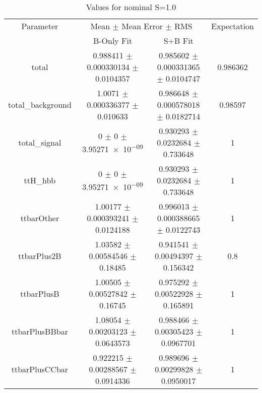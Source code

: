 \begin{table}
\centering
\caption{Values for nominal S=1.0}
\begin{tabular}{cccc}
\toprule
Parameter & \multicolumn{2}{c}{Mean $\pm$ Mean Error $\pm$ RMS} & Expectation\\
 & B-Only Fit & S+B Fit & \\
\midrule
total & \num{0.988411} $\pm$ \num{0.000330134} $\pm$ \num{0.0104357} & \num{0.985602} $\pm$ \num{0.000331365} $\pm$ \num{0.0104747} & \num{0.986362}\\
total\_background & \num{1.0071} $\pm$ \num{0.000336377} $\pm$ \num{0.010633} & \num{0.986648} $\pm$ \num{0.000578018} $\pm$ \num{0.0182714} & \num{0.98597}\\
total\_signal & \num{0} $\pm$ \num{0} $\pm$ \num{3.95271e-09} & \num{0.930293} $\pm$ \num{0.0232684} $\pm$ \num{0.733648} & \num{1}\\
ttH\_hbb & \num{0} $\pm$ \num{0} $\pm$ \num{3.95271e-09} & \num{0.930293} $\pm$ \num{0.0232684} $\pm$ \num{0.733648} & \num{1}\\
ttbarOther & \num{1.00177} $\pm$ \num{0.000393241} $\pm$ \num{0.0124188} & \num{0.996013} $\pm$ \num{0.000388665} $\pm$ \num{0.0122743} & \num{1}\\
ttbarPlus2B & \num{1.03582} $\pm$ \num{0.00584546} $\pm$ \num{0.18485} & \num{0.941541} $\pm$ \num{0.00494397} $\pm$ \num{0.156342} & \num{0.8}\\
ttbarPlusB & \num{1.00505} $\pm$ \num{0.00527842} $\pm$ \num{0.16745} & \num{0.975292} $\pm$ \num{0.00522928} $\pm$ \num{0.165891} & \num{1}\\
ttbarPlusBBbar & \num{1.08054} $\pm$ \num{0.00203123} $\pm$ \num{0.0643573} & \num{0.988466} $\pm$ \num{0.00305423} $\pm$ \num{0.0967701} & \num{1}\\
ttbarPlusCCbar & \num{0.922215} $\pm$ \num{0.00288567} $\pm$ \num{0.0914336} & \num{0.989696} $\pm$ \num{0.00299828} $\pm$ \num{0.0950017} & \num{1}\\
\bottomrule
\end{tabular}
\end{table}
